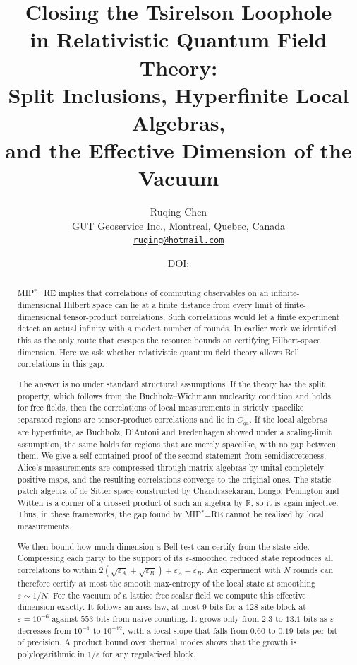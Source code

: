 \documentclass[11pt]{article}
\title{Closing the Tsirelson Loophole\\ in Relativistic Quantum Field Theory:\\
Split Inclusions, Hyperfinite Local Algebras,\\ and the Effective Dimension of the Vacuum}
\author{Ruqing Chen\\[2pt]
\small GUT Geoservice Inc., Montreal, Quebec, Canada\\
\small \href{mailto:ruqing@hotmail.com}{\texttt{ruqing@hotmail.com}}}
\date{\small DOI: \href{https://doi.org/\paperdoi}{\paperdoi}}
\theoremstyle{definition}\newtheorem{definition}{Definition}[section]
\theoremstyle{remark}\newtheorem*{remark}{Remark}
\newcommand{\Cqa}{C_{qa}}
\begin{document}
\maketitle

\begin{abstract}
MIP$^*$=RE implies that correlations of commuting observables on an infinite-dimensional Hilbert space can lie at a
finite distance from every limit of finite-dimensional tensor-product correlations. Such correlations would let a
finite experiment detect an actual infinity with a modest number of rounds. In earlier work we identified this as the
only route that escapes the resource bounds on certifying Hilbert-space dimension. Here we ask whether relativistic
quantum field theory allows Bell correlations in this gap.

The answer is no under standard structural assumptions. If the theory has the split property, which follows from the
Buchholz--Wichmann nuclearity condition and holds for free fields, then the correlations of local measurements in
strictly spacelike separated regions are tensor-product correlations and lie in $\Cqa$. If the local algebras are
hyperfinite, as Buchholz, D'Antoni and Fredenhagen showed under a scaling-limit assumption, the same holds for regions
that are merely spacelike, with no gap between them. We give a self-contained proof of the second statement from
semidiscreteness. Alice's measurements are compressed through matrix algebras by unital completely positive maps, and
the resulting correlations converge to the original ones. The static-patch algebra of de Sitter space constructed by
Chandrasekaran, Longo, Penington and Witten is a corner of a crossed product of such an algebra by $\mathbb R$, so it is
again injective. Thus, in these frameworks, the gap found by MIP$^*$=RE cannot be realised by local measurements.

We then bound how much dimension a Bell test can certify from the state side. Compressing each party to the support of
its $\varepsilon$-smoothed reduced state reproduces all correlations to within $2(\sqrt{\varepsilon_A}+\sqrt{\varepsilon_B})+\varepsilon_A+\varepsilon_B$. An experiment
with $N$ rounds can therefore certify at most the smooth max-entropy of the local state at smoothing $\varepsilon\sim1/N$. For
the vacuum of a lattice free scalar field we compute this effective dimension exactly. It follows an area law, at
most $9$ bits for a $128$-site block at $\varepsilon=10^{-6}$ against $553$ bits from naive counting. It grows only from $2.3$ to
$13.1$ bits as $\varepsilon$ decreases from $10^{-1}$ to $10^{-12}$, with a local slope that falls from $0.60$ to $0.19$ bits per bit of
precision. A product bound over thermal modes shows that the growth is polylogarithmic in $1/\varepsilon$ for any regularised block.
\end{abstract}
\end{document}
